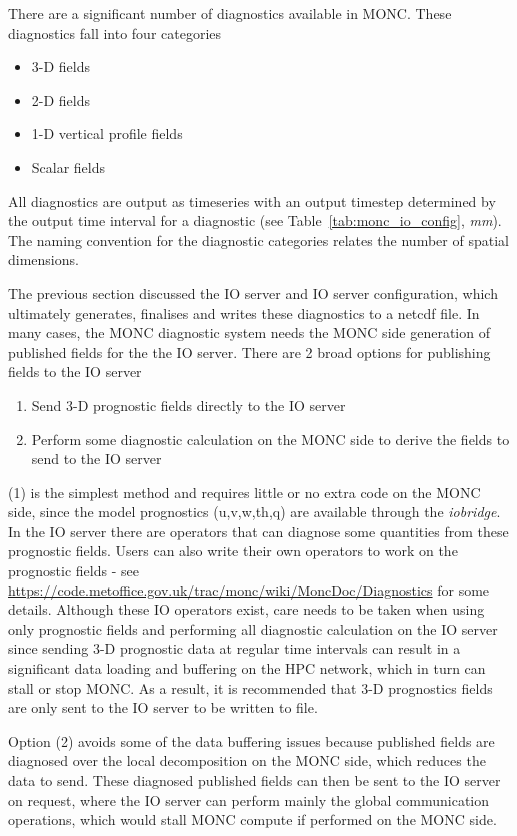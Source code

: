 \documentclass[a4paper,11pt]{article}
\begin{document}
There are a significant number of diagnostics available in MONC. These diagnostics
fall into four categories
\begin{itemize}
  \item {3-D fields}
  \item {2-D fields}
  \item {1-D vertical profile fields}
  \item {Scalar fields}
\end{itemize}
All diagnostics are output as timeseries with an output
timestep determined by the output time interval for a diagnostic (see
Table~\ref{tab:monc_io_config}, \emph{mm}). The naming convention for the
diagnostic categories relates the number of spatial dimensions.

The previous section discussed the IO server and IO server configuration, which
ultimately generates, finalises and writes these diagnostics to a netcdf file.
In many cases, the MONC diagnostic system needs the MONC side generation of
published fields for the the IO server. There are 2 broad options for publishing fields
to the IO server
\begin{enumerate}
  \item {Send 3-D prognostic fields directly to the IO server}
  \item {Perform some diagnostic calculation on the MONC side to derive the fields
  to send to the IO server}
\end{enumerate}
(1) is the simplest method and requires little or no extra code on the MONC side, since
the model prognostics (u,v,w,th,q) are available through the \emph{iobridge}.
In the IO server there are operators that can diagnose some quantities from these
prognostic fields. Users can also write their own operators to work on the
prognostic fields - see \url{https://code.metoffice.gov.uk/trac/monc/wiki/MoncDoc/Diagnostics}
for some details. Although these IO operators exist, care needs to be taken
when using only prognostic fields and performing all diagnostic calculation on
the IO server since sending 3-D prognostic data at regular time intervals
can result in a significant data loading and buffering on the
HPC network, which in turn can stall or stop MONC. As a result, it is recommended
that 3-D prognostics fields are only sent to the IO server to be written to file.

Option (2) avoids some of the data buffering issues because published fields are
diagnosed over the local decomposition on the MONC side, which reduces the data
to send. These diagnosed published fields can then be sent to the IO server on
request, where the IO server can perform mainly the global communication
operations, which would stall MONC compute if performed on the MONC side.
\end{document}
